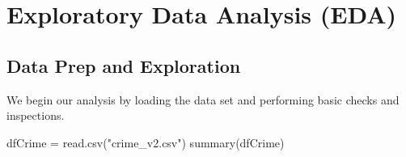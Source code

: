 \documentclass[]{article}
\newenvironment{Shaded}{}{}
\newcommand{\KeywordTok}[1]{\textcolor[rgb]{0.00,0.00,1.00}{#1}}
\newcommand{\NormalTok}[1]{#1}
\newcommand{\StringTok}[1]{\textcolor[rgb]{0.00,0.50,0.50}{#1}}
\begin{document}
\hypertarget{exploratory-data-analysis-eda}{%
\section{Exploratory Data Analysis
(EDA)}\label{exploratory-data-analysis-eda}}

\hypertarget{data-prep-and-exploration}{%
\subsection{Data Prep and Exploration}\label{data-prep-and-exploration}}

We begin our analysis by loading the data set and performing basic
checks and inspections.

\begin{Shaded}
\begin{Highlighting}[]
\NormalTok{dfCrime =}\StringTok{ }\KeywordTok{read.csv}\NormalTok{(}\StringTok{"crime_v2.csv"}\NormalTok{)}
\KeywordTok{summary}\NormalTok{(dfCrime)}
\end{Highlighting}
\end{Shaded}
\end{document}
